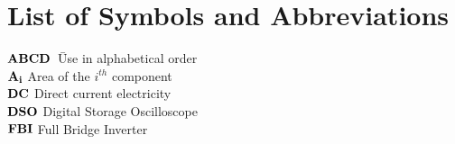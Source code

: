 %
%
%
%
%
%


\chapter*{List of Symbols and Abbreviations}




\begin{tabbing}



\hspace{1cm}\= {$ \bf ABCD  $}\qquad\ \quad\= Use in alphabetical order\\[5pt]

\> {$ \bf A_i  $} \> Area of the $i^{th}$ component\\[5pt]

\> {$ \bf DC $} \>   Direct current electricity\\[5pt]

\> {$ \bf DSO  $} \> Digital Storage Oscilloscope\\[5pt]

\> {$ \bf FBI  $} \> Full Bridge Inverter\\



\end{tabbing}